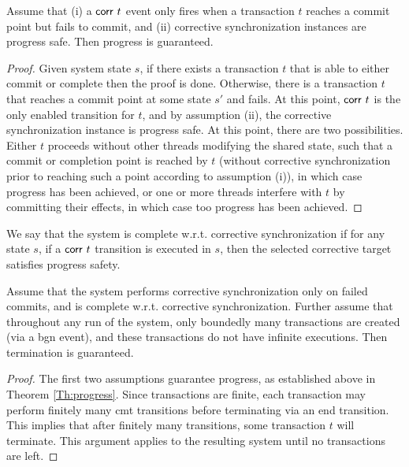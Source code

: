 \begin{theorem}[Progress]\label{Th:progress} Assume that (i) a ${\sf corr}\ t$ event only fires when a transaction $t$ reaches a commit point but fails to commit, and (ii) corrective synchronization instances are progress safe. Then progress is guaranteed.
	\begin{proof}
	Given system state $s$, if there exists a transaction $t$ that is able to either commit or complete then the proof is done. Otherwise, there is a transaction $t$ that reaches a commit point at some state $s'$ and fails. At this point, ${\sf corr}\ t$ is the only enabled transition for $t$, and by assumption (ii), the corrective synchronization instance is progress safe. At this point, there are two possibilities. Either $t$ proceeds without other threads modifying the shared state, such that a commit or completion point is reached by $t$ (without corrective synchronization prior to reaching such a point according to assumption (i)), in which case progress has been achieved, or one or more threads interfere with $t$ by committing their effects, in which case too progress has been achieved.
	\end{proof}
\end{theorem}

\begin{definition} 
	We say that the system is complete w.r.t. corrective synchronization if for any state $s$, if a ${\sf corr}\ t$ transition is executed in $s$, then the selected corrective target satisfies progress safety.
\end{definition}

\begin{lemma}[Termination]
	Assume that the system performs corrective synchronization only on failed commits, and is complete w.r.t. corrective synchronization. Further assume that throughout any run of the system, only boundedly many transactions are created (via a {\sf bgn} event), and these transactions do not have infinite executions. Then termination is guaranteed. \vspace{3pt}
	\begin{proof}
		The first two assumptions guarantee progress, as established above in 
		Theorem \ref{Th:progress}. Since transactions are finite, each transaction may perform finitely many {\sf cmt} transitions before terminating via an {\sf end} transition. This implies that after finitely many transitions, some transaction $t$ will terminate. This argument applies to the resulting system until no transactions are left.
	\end{proof}
\end{lemma}

